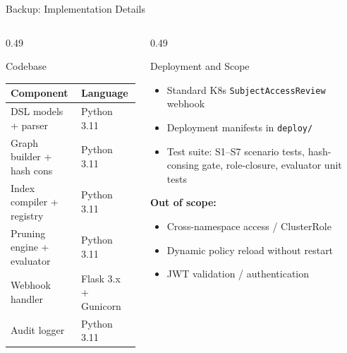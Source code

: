 \documentclass[aspectratio=169,10pt]{beamer}
\newcommand{\tightitems}{%
  \setlength{\topsep}{1pt}%
  \setlength{\itemsep}{2pt}%
  \setlength{\parsep}{0pt}%
  \setlength{\parskip}{0pt}%
}
\begin{document}
\begin{frame}[t,noframenumbering]{Backup: Implementation Details}
\vspace{3pt}
\begin{columns}[T,onlytextwidth]
\begin{column}{0.49\textwidth}
\begin{callout}{Codebase}
\setlength{\tabcolsep}{3pt}
\renewcommand{\arraystretch}{1.1}
\begin{tabular}{@{}l l@{}}
\toprule
\tiny Component & \tiny Language \\
\midrule
\tiny DSL models + parser       & \tiny Python 3.11 \\
\tiny Graph builder + hash cons & \tiny Python 3.11 \\
\tiny Index compiler + registry & \tiny Python 3.11 \\
\tiny Pruning engine + evaluator& \tiny Python 3.11 \\
\tiny Webhook handler           & \tiny Flask 3.x + Gunicorn \\
\tiny Audit logger              & \tiny Python 3.11 \\
\bottomrule
\end{tabular}
\end{callout}
\end{column}
\begin{column}{0.49\textwidth}
\begin{callout}{Deployment and Scope}
\begin{itemize}\tightitems
\item Standard K8s \texttt{SubjectAccessReview} webhook
\item Deployment manifests in \texttt{deploy/}
\item Test suite: S1--S7 scenario tests, hash-consing gate, role-closure, evaluator unit tests
\end{itemize}
\vspace{2pt}
\textbf{Out of scope:}
\begin{itemize}\tightitems
\item Cross-namespace access / ClusterRole
\item Dynamic policy reload without restart
\item JWT validation / authentication
\end{itemize}
\end{callout}
\end{column}
\end{columns}
\end{frame}
\end{document}

